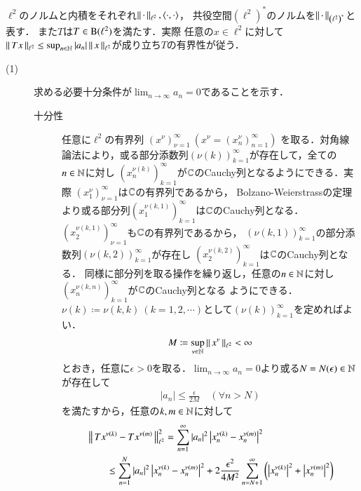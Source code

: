 	\begin{prf} $\ell^2$のノルムと内積をそれぞれ$\Norm{\cdot}{\ell^2},\inprod<\cdot,\cdot>$，
		共役空間$\left( \ell^2 \right)^*$のノルムを$\left\|\, \cdot\, \right\|_{\left( \ell^2 \right)^*}$と表す．
		また$T$は$T \in \mathrm{B}(\ell^2) $を満たす．実際
		任意の$x \in \ell^2$に対して$\left\|\, Tx\, \right\|_{\ell^2} \leq \operatorname*{sup}_{n \in \mathbb{N}} |a_n| \left\|\, x\, \right\|_{\ell^2}$が成り立ち$T$の有界性が従う．
		\begin{description}
			\item[(1)] 求める必要十分条件が$\lim_{n \to \infty} a_n = 0$であることを示す．
				\begin{description}
					\item[十分性] 任意に$\ell^2$の有界列
						$\left( x^{\nu} \right)_{\nu=1}^{\infty}\ \left(x^{\nu} = \left( x^{\nu}_n \right)_{n=1}^{\infty} \right)$
						を取る．対角線論法により，或る部分添数列$(\nu(k))_{k=1}^{\infty}$が存在して，全ての$n \in \mathbb{N}$に対し
						$\left(x_n^{\nu(k)} \right)_{k=1}^{\infty}$が$\mathbb{C}$のCauchy列となるようにできる．実際
						$\left( x^{\nu}_1 \right)_{\nu=1}^{\infty}$は$\mathbb{C}$の有界列であるから，
						Bolzano-Weierstrassの定理より或る部分列$\left( x^{\nu(k,1)}_1 \right)_{k=1}^{\infty}$は$\mathbb{C}$のCauchy列となる．
						$\left( x^{\nu(k,1)}_2 \right)_{\nu=1}^{\infty}$も$\mathbb{C}$の有界列であるから，
						$(\nu(k,1))_{k=1}^{\infty}$の部分添数列$(\nu(k,2))_{k=1}^{\infty}$が存在し
						$\left( x^{\nu(k,2)}_2 \right)_{k=1}^{\infty}$は$\mathbb{C}$のCauchy列となる．
						同様に部分列を取る操作を繰り返し，任意の$n \in \mathbb{N}$に対し
						$\left( x^{\nu(k,n)}_n \right)_{k=1}^{\infty}$が$\mathbb{C}$のCauchy列となる
						ようにできる．$\nu(k) \coloneqq \nu(k,k)\ (k=1,2,\cdots)$として$(\nu(k))_{k=1}^{\infty}$を定めればよい．
						\begin{align}
							M \coloneqq \operatorname*{sup}_{\nu \in \mathbb{N}} \left\|\, x^\nu\, \right\|_{\ell^2} < \infty
						\end{align}
						とおき，任意に$\epsilon > 0$を取る．$\lim_{n \to \infty} a_n = 0$より或る$N = N(\epsilon) \in \mathbb{N}$が存在して
						\begin{align}
							|a_n| \leq \frac{\epsilon}{2 M} \quad (\forall n > N)
						\end{align}
						を満たすから，任意の$k,m \in \mathbb{N}$に対して
						\begin{align}
							&\Norm{T x^{\nu(k)} - T x^{\nu(m)}}{\ell^2}^2
							= \sum_{n=1}^{\infty} |a_n|^2 \left|x_n^{\nu(k)} - x_n^{\nu(m)} \right|^2 \\
							&\qquad \leq \sum_{n=1}^{N} |a_n|^2 \left|x_n^{\nu(k)} - x_n^{\nu(m)} \right|^2 
								+ 2 \frac{\epsilon^2}{4 M^2} \sum_{n = N+1}^{\infty} \left( \left|x_n^{\nu(k)} \right|^2 + \left|x_n^{\nu(m)} \right|^2 \right) \\

\end{align}
\end{description}
\end{description}
\end{prf}

